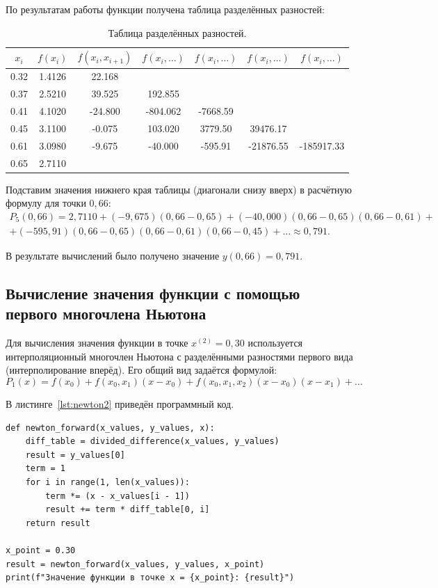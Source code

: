 \documentclass[a4paper, final]{article}
\begin{document}
По результатам работы функции получена таблица разделённых разностей:

\begin{table}[h!]
\centering
\begin{tabular}{|c|c|c|c|c|c|c|}
\hline
$x_i$ & $f(x_i)$ & $f(x_i, x_{i+1})$ & $f(x_i, \dots)$ & $f(x_i, \dots)$ & $f(x_i, \dots)$ & $f(x_i, \dots)$ \\
\hline
0.32 & 1.4126 & 22.168 & & & & \\
0.37 & 2.5210 & 39.525 & 192.855 & & & \\
0.41 & 4.1020 & -24.800 & -804.062 & -7668.59 & & \\
0.45 & 3.1100 & -0.075 & 103.020 & 3779.50 & 39476.17 & \\
0.61 & 3.0980 & -9.675 & -40.000 & -595.91 & -21876.55 & -185917.33 \\
0.65 & 2.7110 & & & & & \\
\hline
\end{tabular}
\caption{Таблица разделённых разностей.}
\label{tab:div_diff}
\end{table}

Подставим значения нижнего края таблицы (диагонали снизу вверх) в расчётную формулу для точки $0{,}66$:
\begin{multline*}
P_5(0{,}66) = 2{,}7110 + (-9{,}675)(0{,}66 - 0{,}65) + (-40{,}000)(0{,}66 - 0{,}65)(0{,}66 - 0{,}61) + \\
+ (-595{,}91)(0{,}66 - 0{,}65)(0{,}66 - 0{,}61)(0{,}66 - 0{,}45) + \dots \approx 0{,}791.
\end{multline*}

В результате вычислений было получено значение \(y(0{,}66) = 0{,}791\).

\subsection{Вычисление значения функции с помощью первого многочлена Ньютона}

Для вычисления значения функции в точке \(x^{(2)} = 0{,}30\) используется интерполяционный многочлен Ньютона с разделёнными разностями первого вида (интерполирование вперёд). Его общий вид задаётся формулой:
\[
P_1(x) = f(x_0) + f(x_0, x_1)(x - x_0) + f(x_0, x_1, x_2)(x - x_0)(x - x_1) + \dots
\]

В листинге~\ref{lst:newton2} приведён программный код.

\begin{lstlisting}[caption={Вычисление значения функции с помощью первого многочлена Ньютона}, label=lst:newton2]
def newton_forward(x_values, y_values, x):
    diff_table = divided_difference(x_values, y_values)
    result = y_values[0]
    term = 1
    for i in range(1, len(x_values)):
        term *= (x - x_values[i - 1])
        result += term * diff_table[0, i]
    return result

x_point = 0.30
result = newton_forward(x_values, y_values, x_point)
print(f"Значение функции в точке x = {x_point}: {result}")
\end{lstlisting}
\end{document}
